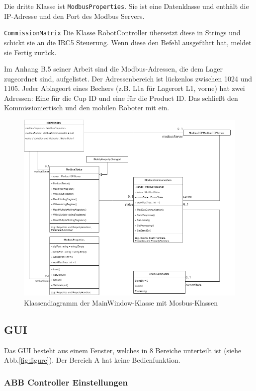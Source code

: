 Die dritte Klasse ist \verb|ModbusProperties|.
Sie ist eine Datenklasse und enthält die IP-Adresse und den Port des Modbus Servers.

\verb|CommissionMatrix|
Die Klasse RobotController übersetzt diese in Strings und schickt sie an die IRC5 Steuerung.
Wenn diese den Befehl ausgeführt hat, meldet sie \glqq Fertig\grqq{} zurück.

Im Anhang B.5 seiner Arbeit sind die Modbus-Adressen, die dem Lager zugeordnet sind, aufgelistet.
Der Adressenbereich ist lückenlos zwischen 1024 und 1105.
Jeder Ablageort eines Bechers (z.B. L1a für Lagerort L1, vorne) hat zwei Adressen: Eine für die Cup ID und eine
für die Product ID.
Das schließt den Kommissioniertisch und den mobilen Roboter mit ein.

\begin{figure}
    \caption[Klassendiagramm Modbus ]
    {\small Klassendiagramm der MainWindow-Klasse mit Mosbus-Klassen }\label{fig:figure4}
    \includegraphics[width = \textwidth ]{Bilder/LV_Klassendiagramm_Modbus}
    \centering
\end{figure}

\subsection{GUI}
Das GUI besteht aus einem Fenster, welches in 8 Bereiche unterteilt ist (siehe Abb.\ref{fig:figure}).
Der Bereich \glqq A\grqq{} hat keine Bedienfunktion.

\subsubsection{ABB Controller Einstellungen}

